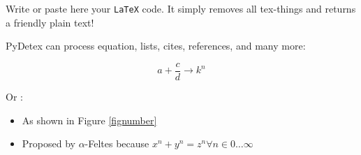 Write or paste here your \texttt{LaTeX} code. It simply removes all tex-things and returns a friendly plain text! %

PyDetex can process equation, lists, cites, references, and many more:

\begin{equation}
   a + \frac{c}{d} \longrightarrow k^n
\end{equation}

Or :

\begin{itemize}[font=\bfseries]
   \item As shown in Figure \ref{fignumber}
   \item Proposed by $\alpha$-Feltes \cite{feltes2008} because $x^n + y^n = z^n \forall n \in 0 \ldots \infty$
\end{itemize}